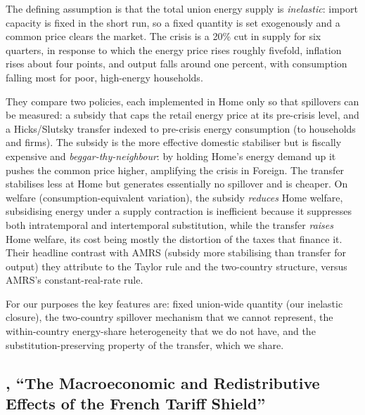 The defining assumption is that the total union energy supply is
\emph{inelastic}: import capacity is fixed in the short run, so a fixed quantity
is set exogenously and a common price clears the market. The crisis is a 20\%
cut in supply for six quarters, in response to which the energy price rises
roughly fivefold, inflation rises about four points, and output falls around
one percent, with consumption falling most for poor, high-energy households.

They compare two policies, each implemented in Home only so that spillovers can
be measured: a subsidy that caps the retail energy price at its pre-crisis
level, and a Hicks/Slutsky transfer indexed to pre-crisis energy consumption
(to households and firms). The subsidy is the more effective domestic
stabiliser but is fiscally expensive and \emph{beggar-thy-neighbour}: by
holding Home's energy demand up it pushes the common price higher, amplifying
the crisis in Foreign. The transfer stabilises less at Home but generates
essentially no spillover and is cheaper. On welfare (consumption-equivalent
variation), the subsidy \emph{reduces} Home welfare, subsidising energy under a
supply contraction is inefficient because it suppresses both intratemporal and
intertemporal substitution, while the transfer \emph{raises} Home welfare, its
cost being mostly the distortion of the taxes that finance it. Their headline
contrast with AMRS (subsidy more stabilising than transfer for output) they
attribute to the Taylor rule and the two-country structure, versus AMRS's
constant-real-rate rule.

For our purposes the key features are: fixed union-wide quantity (our inelastic
closure), the two-country spillover mechanism that we cannot represent, the
within-country energy-share heterogeneity that we do not have, and the
substitution-preserving property of the transfer, which we share.

\subsection{\citet{Langot2026}, ``The Macroeconomic and Redistributive Effects
of the French Tariff Shield''}

